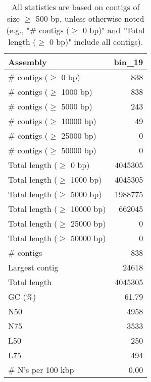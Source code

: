 \documentclass[12pt,a4paper]{article}
\begin{document}
\begin{table}[ht]
\begin{center}
\caption{All statistics are based on contigs of size $\geq$ 500 bp, unless otherwise noted (e.g., "\# contigs ($\geq$ 0 bp)" and "Total length ($\geq$ 0 bp)" include all contigs).}
\begin{tabular}{|l*{1}{|r}|}
\hline
Assembly & bin\_19 \\ \hline
\# contigs ($\geq$ 0 bp) & 838 \\ \hline
\# contigs ($\geq$ 1000 bp) & 838 \\ \hline
\# contigs ($\geq$ 5000 bp) & 243 \\ \hline
\# contigs ($\geq$ 10000 bp) & 49 \\ \hline
\# contigs ($\geq$ 25000 bp) & 0 \\ \hline
\# contigs ($\geq$ 50000 bp) & 0 \\ \hline
Total length ($\geq$ 0 bp) & 4045305 \\ \hline
Total length ($\geq$ 1000 bp) & 4045305 \\ \hline
Total length ($\geq$ 5000 bp) & 1988775 \\ \hline
Total length ($\geq$ 10000 bp) & 662045 \\ \hline
Total length ($\geq$ 25000 bp) & 0 \\ \hline
Total length ($\geq$ 50000 bp) & 0 \\ \hline
\# contigs & 838 \\ \hline
Largest contig & 24618 \\ \hline
Total length & 4045305 \\ \hline
GC (\%) & 61.79 \\ \hline
N50 & 4958 \\ \hline
N75 & 3533 \\ \hline
L50 & 250 \\ \hline
L75 & 494 \\ \hline
\# N's per 100 kbp & 0.00 \\ \hline
\end{tabular}
\end{center}
\end{table}
\end{document}
